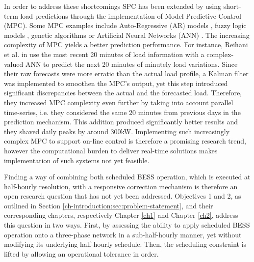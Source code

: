 
%

In order to address these shortcomings SPC has been extended by using short-term load predictions through the implementation of Model Predictive Control (MPC).
Some MPC examples include Auto-Regressive (AR) models \cite{Li2009, Nie2011}, fuzzy logic models \cite{Sannomiya2001, Chen2013a}, genetic algorithms \cite{Xia2015a, Liu2015} or Artificial Neural Networks (ANN) \cite{Kalogirou2014, Quan2014, Lee2014, Pezeshki2014, Vaz2016, Reihani2016, Xiao2017}.
The increasing complexity of MPC yields a better prediction performance.
For instance, Reihani et al. in \cite{Reihani2016} use the most recent 20 minutes of load information with a complex-valued ANN to predict the next 20 minutes of minutely load variations.
Since their raw forecasts were more erratic than the actual load profile, a Kalman filter was implemented to smoothen the MPC's output, yet this step introduced significant discrepancies between the actual and the forecasted load.
Therefore, they increased MPC complexity even further by taking into account parallel time-series, i.e. they considered the same 20 minutes from previous days in the prediction mechanism.
This addition produced significantly better results and they shaved daily peaks by around 300kW.
Implementing such increasingly complex MPC to support on-line control is therefore a promising research trend, however the computational burden to deliver real-time solutions makes implementation of such systems not yet feasible.

Finding a way of combining both scheduled BESS operation, which is executed at half-hourly resolution, with a responsive correction mechanism is therefore an open research question that has not yet been addressed.
Objectives 1 and 2, as outlined in Section \ref{ch-introduction:sec:problem-statement}, and their corresponding chapters, respectively Chapter \ref{ch1} and Chapter \ref{ch2}, address this question in two ways.
First, by assessing the ability to apply scheduled BESS operation onto a three-phase network in a sub-half-hourly manner, yet without modifying its underlying half-hourly schedule.
Then, the scheduling constraint is lifted by allowing an operational tolerance in order.

